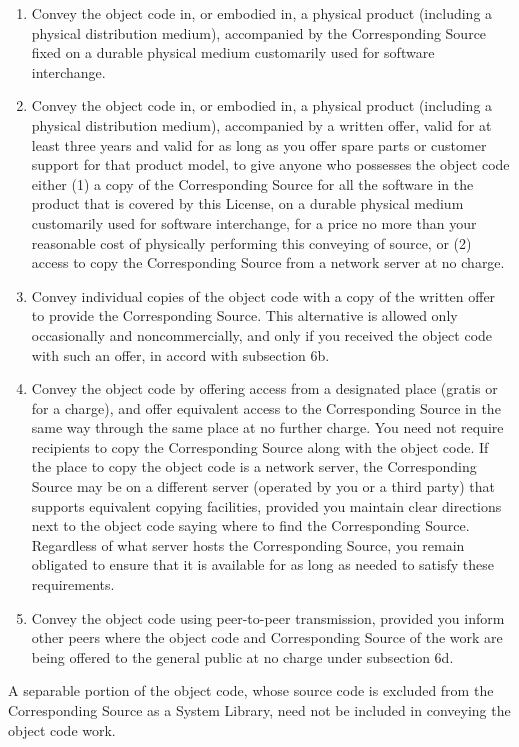 \documentclass[a4paper, 11pt, twoside]{article}
\begin{document}
\begin{enumerate}[label=\Alph*)]
\item Convey the object code in, or embodied in, a physical product (including a physical distribution medium), accompanied by the Corresponding Source fixed on a durable physical medium customarily used for software interchange.
\item Convey the object code in, or embodied in, a physical product (including a physical distribution medium), accompanied by a written offer, valid for at least three years and valid for as long as you offer spare parts or customer support for that product model, to give anyone who possesses the object code either (1) a copy of the Corresponding Source for all the software in the product that is covered by this License, on a durable physical medium customarily used for software interchange, for a price no more than your reasonable cost of physically performing this conveying of source, or (2) access to copy the Corresponding Source from a network server at no charge.
\item Convey individual copies of the object code with a copy of the written offer to provide the Corresponding Source. This alternative is allowed only occasionally and noncommercially, and only if you received the object code with such an offer, in accord with subsection 6b.
\item Convey the object code by offering access from a designated place (gratis or for a charge), and offer equivalent access to the Corresponding Source in the same way through the same place at no further charge. You need not require recipients to copy the Corresponding Source along with the object code. If the place to copy the object code is a network server, the Corresponding Source may be on a different server (operated by you or a third party) that supports equivalent copying facilities, provided you maintain clear directions next to the object code saying where to find the Corresponding Source. Regardless of what server hosts the Corresponding Source, you remain obligated to ensure that it is available for as long as needed to satisfy these requirements.
\item Convey the object code using peer-to-peer transmission, provided you inform other peers where the object code and Corresponding Source of the work are being offered to the general public at no charge under subsection 6d.
\end{enumerate}

A separable portion of the object code, whose source code is excluded from the Corresponding Source as a System Library, need not be included in conveying the object code work.
\end{document}

